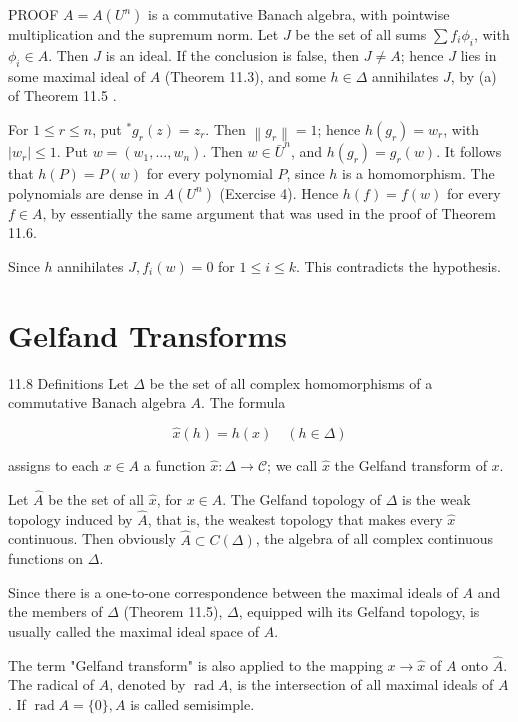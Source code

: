 \documentclass[10pt]{article}
\begin{document}
PROOF $A=A\left(U^{n}\right)$ is a commutative Banach algebra, with pointwise multiplication and the supremum norm. Let $J$ be the set of all sums $\sum f_{i} \phi_{i}$, with $\phi_{i} \in A$. Then $J$ is an ideal. If the conclusion is false, then $J \neq A$; hence $J$ lies in some maximal ideal of $A$ (Theorem 11.3), and some $h \in \Delta$ annihilates $J$, by (a) of Theorem 11.5 .

For $1 \leq r \leq n$, put ${ }^{*} g_{r}(z)=z_{r}$. Then $\left\|g_{r}\right\|=1$; hence $h\left(g_{r}\right)=w_{r}$, with $\left|w_{r}\right| \leq 1$. Put $w=\left(w_{1}, \ldots, w_{n}\right)$. Then $w \in \bar{U}^{n}$, and $h\left(g_{r}\right)=g_{r}(w)$. It follows that $h(P)=P(w)$ for every polynomial $P$, since $h$ is a homomorphism. The polynomials are dense in $A\left(U^{n}\right)$ (Exercise 4). Hence $h(f)=f(w)$ for every $f \in A$, by essentially the same argument that was used in the proof of Theorem 11.6.

Since $h$ annihilates $J, f_{i}(w)=0$ for $1 \leq i \leq k$. This contradicts the hypothesis.

\section{Gelfand Transforms}
11.8 Definitions Let $\Delta$ be the set of all complex homomorphisms of a commutative Banach algebra $A$. The formula

$$
\hat{x}(h)=h(x) \quad(h \in \Delta)
$$

assigns to each $x \in A$ a function $\hat{x}: \Delta \rightarrow \mathscr{C}$; we call $\hat{x}$ the Gelfand transform of $x$.

Let $\hat{A}$ be the set of all $\hat{x}$, for $x \in A$. The Gelfand topology of $\Delta$ is the weak topology induced by $\hat{A}$, that is, the weakest topology that makes every $\hat{x}$ continuous. Then obviously $\hat{A} \subset C(\Delta)$, the algebra of all complex continuous functions on $\Delta$.

Since there is a one-to-one correspondence between the maximal ideals of $A$ and the members of $\Delta$ (Theorem 11.5), $\Delta$, equipped wilh its Gelfand topology, is usually called the maximal ideal space of $A$.

The term "Gelfand transform" is also applied to the mapping $x \rightarrow \hat{x}$ of $A$ onto $\hat{A}$. The radical of $A$, denoted by $\operatorname{rad} A$, is the intersection of all maximal ideals of $A$. If $\operatorname{rad} A=\{0\}, A$ is called semisimple.
\end{document}
